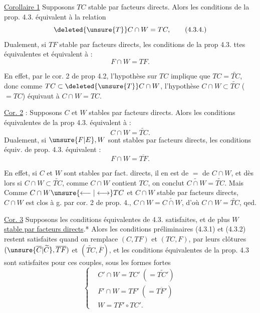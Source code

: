 \uline{Corollaire 1} Supposons $TC$ stable par facteurs directs.
\margin{$\Big|$}Alors  les conditions de la prop. 4.3. 
équivalent à la relation
\[
\deleted{\unsure{T}}C\cap W=TC,
\tag*{(4.3.4.)}
\]
\margin{$\Big|$}Dualement, si $TF$ stable par facteurs directs,
les conditions de la prop 4.3.  ttes équivalentes
et équivalent à :
\[
F\cap W=TF.
\tag*{(4.3.4$'$)}
\]

En effet, par le cor. 2 de prop 4.2, l'hypothèse sur $TC$
implique que $TC=\widetilde{TC}$, donc comme $TC\subset\deleted{\unsure{T}}C\cap W$,
l'hypothèse $C\cap W\subset\widetilde{TC}$ ($=TC$) équivaut à $C\cap W=TC$.

\uline{Cor. 2} : Supposons $C$ et $W$ stables par facteurs
directs. Alors les conditions équivalentes de
la prop 4.3. équivalent à :
\[
C\cap W=\widetilde{TC}.
\tag*{(4.3.5.)}
\]
Dualement, si $\unsure{F|E},W$ sont stables par facteurs directs,
les conditions équiv. de prop. 4.3. équivalent :
\[
F\cap W=\overline{TF}.
\tag*{(4.3.5$'$)}
\]

En effet, si $C$ et $W$ sont stables par fact. directs,
il en est de $=$ de $C\cap W$, et  dès
lors si $C\cap W\subset\widetilde{TC}$, comme $C\cap W$ contient $TC$,
 on conclut $\widetilde{C\cap W}=\widetilde{TC}$. Mais
 Comme $C\cap W\unsure{\longleftarrow|\longleftrightarrow} TC$ et $C\cap W$
stable par facteurs directs, $C\cap W$ est clos à g.
par cor. 2 de prop. 4.,  $C\cap W=\widetilde{C\cap W}$,
d'où $C\cap W=\widetilde{TC}$, qed.

\uline{Cor. 3} Supposons les conditions équivalentes  de
4.3. satisfaites, et de plus \uline{$W$ stable par
facteurs directs}.* Alors les conditions préliminaires
(4.3.1) et (4.3.2) restent satisfaites quand on
remplace $(C,TF)$ et $(TC,F)$, par leurs
clôtures $(\unsure{\overline C|\widetilde C},\overline{TF})$ et $(\widetilde{TC},\overline F)$,
et les conditions équivalentes de la prop. 4.3 sont  satisfaites
 pour ces couples, sous les formes fortes
\[
\left\{\begin{aligned}
&C'\cap W=TC'\ (= \widetilde{TC'})\\
&F'\cap W=TF'\ (= \overline{TF'})\\
&W=TF'\circ TC'.
\end{aligned}\right.
\tag*{(4.3.6)}
\]

